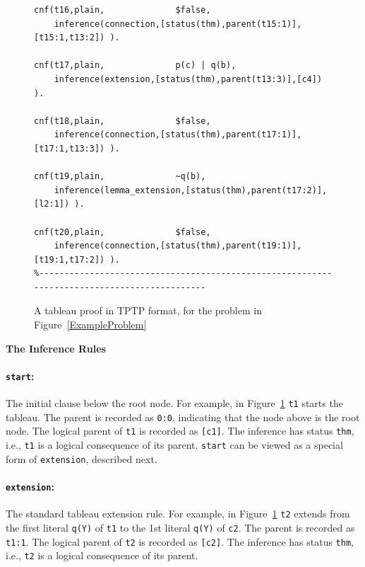 \documentclass{ceurart}
\newcommand{\smalltt}[1]{\small \texttt{#1}}
\newcommand{\tildenot}{\raisebox{0.4ex}{\texttildelow}}
\begin{document}
\begin{figure}[h!]
{{\begin{verbatim}
cnf(t16,plain,              $false,
    inference(connection,[status(thm),parent(t15:1)],[t15:1,t13:2]) ).

cnf(t17,plain,              p(c) | q(b),
    inference(extension,[status(thm),parent(t13:3)],[c4]) ).

cnf(t18,plain,              $false,
    inference(connection,[status(thm),parent(t17:1)],[t17:1,t13:3]) ).

cnf(t19,plain,              ~q(b),
    inference(lemma_extension,[status(thm),parent(t17:2)],[l2:1]) ).

cnf(t20,plain,              $false,
    inference(connection,[status(thm),parent(t19:1)],[t19:1,t17:2]) ).
%--------------------------------------------------------------------------------------------
\end{verbatim}
}}
\caption{A tableau proof in TPTP format, for the problem in Figure~\ref{ExampleProblem}}
\label{ExampleTableau}
\end{figure}

\vspace*{1em}

\noindent
\begin{minipage}{\textwidth}
\textbf{The Inference Rules}

\paragraph{{\tt start}:} The initial clause below the root node.
For example, in Figure~\ref{ExampleTableau} \smalltt{t1} starts the tableau.
The parent is recorded as \smalltt{0:0}, indicating that the node above is the root node.
The logical parent of \smalltt{t1} is recorded as \smalltt{[c1]}. 
The inference has status \smalltt{thm}, i.e., \smalltt{t1} is a logical consequence of its
parent.
{\tt start} can be viewed as a special form of {\tt extension}, described next.
\end{minipage}

\paragraph{{\tt extension}:} The standard tableau extension rule.
For example, in Figure~\ref{ExampleTableau} \smalltt{t2} extends from the first literal 
\smalltt{q(Y)} of \smalltt{t1} to the 1st literal \smalltt{{\tildenot}q(Y)} of \smalltt{c2}.
The parent is recorded as \smalltt{t1:1}. 
The logical parent of \smalltt{t2} is recorded as \smalltt{[c2]}. 
The inference has status \smalltt{thm}, i.e., \smalltt{t2} is a logical consequence of its parent.
\end{document}
